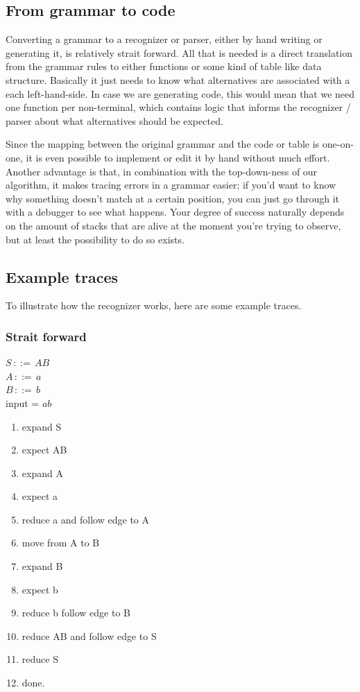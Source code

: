 \documentclass[a4paper,10pt]{article}
\begin{document}
\subsection{From grammar to code}

Converting a grammar to a recognizer or parser, either by hand writing or generating it, is relatively strait forward. All that is needed is a direct translation from the grammar rules to either functions or some kind of table like data structure. Basically it just needs to know what alternatives are associated with a each left-hand-side. In case we are generating code, this would mean that we need one function per non-terminal, which contains logic that informs the recognizer / parser about what alternatives should be expected.

Since the mapping between the original grammar and the code or table is one-on-one, it is even possible to implement or edit it by hand without much effort. Another advantage is that, in combination with the top-down-ness of our algorithm, it makes tracing errors in a grammar easier; if you'd want to know why something doesn't match at a certain position, you can just go through it with a debugger to see what happens. Your degree of success naturally depends on the amount of stacks that are alive at the moment you're trying to observe, but at least the possibility to do so exists.

\subsection{Example traces}

To illustrate how the recognizer works, here are some example traces.

\subsubsection{Strait forward}
$S\,::=\,AB$\\
$A\,::=\,a$\\
$B\,::=\,b$\\
input = $ab$

\begin{enumerate}
 \setlength{\itemsep}{0pt}
 \setlength{\parskip}{0pt}
 \setlength{\parsep}{0pt}
 
 \item expand S
 \item expect AB
 \item expand A
 \item expect a
 \item reduce a and follow edge to A
 \item move from A to B
 \item expand B
 \item expect b
 \item reduce b follow edge to B
 \item reduce AB and follow edge to S
 \item reduce S
 \item done.
\end{enumerate}
\end{document}
